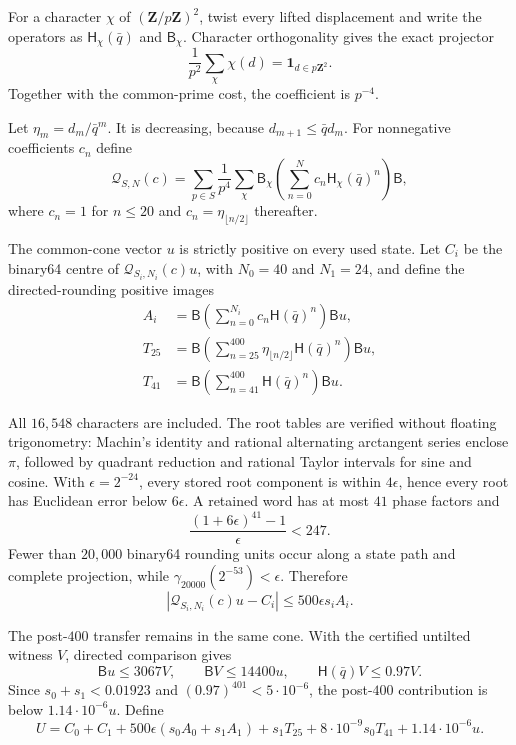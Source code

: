 \documentclass[11pt]{article}
\theoremstyle{definition}
\theoremstyle{remark}
\newcommand{\Z}{\mathbf Z}
\begin{document}
For a character $\chi$ of $(\Z/p\Z)^2$, twist every lifted displacement and
write the operators as $\mathsf H_\chi(\bar q)$ and $\mathsf B_\chi$.
Character orthogonality gives the exact projector
\[
 \frac1{p^2}\sum_\chi\chi(d)=\mathbf1_{d\in p\Z^2}.
\]
Together with the common-prime cost, the coefficient is $p^{-4}$.

Let $\eta_m=d_m/\bar q^m$.  It is decreasing, because
$d_{m+1}\leq\bar qd_m$.  For nonnegative coefficients $c_n$ define
\[
 \mathcal Q_{S,N}(c)=
 \sum_{p\in S}\frac1{p^4}\sum_\chi
 \mathsf B_\chi\left(\sum_{n=0}^Nc_n
 \mathsf H_\chi(\bar q)^n\right)\mathsf B,
\]
where $c_n=1$ for $n\leq20$ and
$c_n=\eta_{\lfloor n/2\rfloor}$ thereafter.

The common-cone vector $u$ is strictly positive on every used state.  Let
$C_i$ be the binary64 centre of $\mathcal Q_{S_i,N_i}(c)u$, with
$N_0=40$ and $N_1=24$, and define the directed-rounding positive images
\begin{align*}
 A_i&=\mathsf B\left(\sum_{n=0}^{N_i}c_n
          \mathsf H(\bar q)^n\right)\mathsf Bu,\\
 T_{25}&=\mathsf B\left(\sum_{n=25}^{400}
          \eta_{\lfloor n/2\rfloor}\mathsf H(\bar q)^n\right)\mathsf Bu,\\
 T_{41}&=\mathsf B\left(\sum_{n=41}^{400}
          \mathsf H(\bar q)^n\right)\mathsf Bu.
\end{align*}

All $16{,}548$ characters are included.  The root tables are verified without
floating trigonometry: Machin's identity and rational alternating arctangent
series enclose $\pi$, followed by quadrant reduction and rational Taylor
intervals for sine and cosine.  With $\epsilon=2^{-24}$, every stored root
component is within $4\epsilon$, hence every root has Euclidean error below
$6\epsilon$.  A retained word has at most $41$ phase factors and
\[
 \frac{(1+6\epsilon)^{41}-1}{\epsilon}<247.
\]
Fewer than $20{,}000$ binary64 rounding units occur along a state path and
complete projection, while $\gamma_{20000}(2^{-53})<\epsilon$.  Therefore
\begin{equation}
\label{eq:phase-error-enclosure}
 |\mathcal Q_{S_i,N_i}(c)u-C_i|\leq500\epsilon s_iA_i.
\end{equation}

The post-$400$ transfer remains in the same cone.  With the certified
untilted witness $V$, directed comparison gives
\[
 \mathsf Bu\leq3067V,\qquad \mathsf BV\leq14400u,
 \qquad \mathsf H(\bar q)V\leq0.97V.
\]
Since $s_0+s_1<0.01923$ and $(0.97)^{401}<5\cdot10^{-6}$, the post-$400$
contribution is below $1.14\cdot10^{-6}u$.  Define
\begin{equation}
\label{eq:repeat-directed-upper}
 U=C_0+C_1+500\epsilon(s_0A_0+s_1A_1)
   +s_1T_{25}+8\cdot10^{-9}s_0T_{41}
   +1.14\cdot10^{-6}u.
\end{equation}
\end{document}

